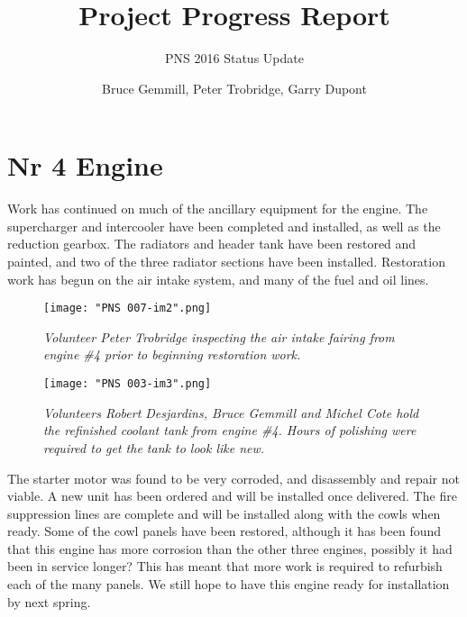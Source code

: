 %


\title{Project Progress Report}
\subtitle{PNS 2016 Status Update}
\author{Bruce Gemmill, Peter Trobridge, Garry Dupont}

\maketitle

\section{Nr 4 Engine}
\label{sec:engine_4}

Work has continued on much of the ancillary equipment for the engine. The
supercharger and intercooler have been completed and installed, as well as the
reduction gearbox. The radiators and header tank have been restored and painted, and
two of the three radiator sections have been installed. Restoration work has
begun on the air intake system, and many of the fuel and oil lines. 

\begin{figure}[htbp]
   \vspace{2em}
   \centering
   \texttt{[image: "PNS 007-im2".png]}
   \caption*{\small \em Volunteer Peter Trobridge inspecting the air intake fairing from engine \#4 prior to beginning restoration work.}
   \label{fig:engine_no_4_2}
\end{figure}

\begin{figure}[htbp]
   \vspace{2em}
   \centering
   \texttt{[image: "PNS 003-im3".png]}
   \caption*{\small \em Volunteers Robert Desjardins, Bruce Gemmill and Michel Cote hold the refinished coolant tank from engine \#4.  Hours of polishing were required to get the tank to look like new.}
   \label{fig:coolant_tank}
\end{figure}

The starter motor was found to be very corroded, and disassembly and repair not viable. A
new unit has been ordered and will be installed once delivered. The fire
suppression lines are complete and will be installed along with the cowls when
ready. Some of the cowl panels have been restored, although it has been found
that this engine has more corrosion than the other three engines, possibly it
had been in service longer? This has meant that more work is required to
refurbish each of the many panels. We still hope to have this engine ready for
installation by next spring. 


